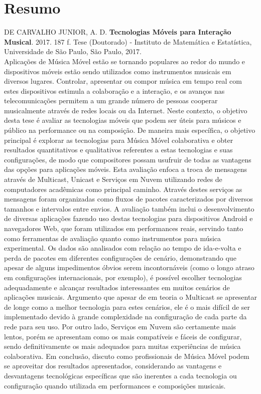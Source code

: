 \documentclass[11pt,twoside,a4paper]{book}
\begin{document}
	\chapter*{Resumo}
	
	\noindent DE CARVALHO JUNIOR, A. D. \textbf{Tecnologias Móveis para Interação Musical}. 
	2017. 187 f.
	Tese (Doutorado) - Instituto de Matemática e Estatística,
	Universidade de São Paulo, São Paulo, 2017.
	\\
	
	Aplicações de Música Móvel estão se tornando populares ao redor do mundo e dispositivos móveis estão sendo utilizados como instrumentos musicais em diversos lugares.
	Controlar, apresentar ou compor música em tempo real com estes dispositivos estimula a colaboração e a interação, e os avanços nas telecomunicações permitem a um grande número de pessoas cooperar musicalmente através de redes locais ou da Internet.
	Neste contexto, o objetivo desta tese é avaliar as tecnologias móveis que podem ser úteis para músicos e público na performance ou na composição.
	De maneira mais específica, o objetivo principal é explorar as tecnologias para Música Móvel colaborativa e obter resultados quantitativos e qualitativos referentes a estas tecnologias e suas configurações, de modo que compositores possam usufruir de todas as vantagens das opções para aplicações móveis.
	Esta avaliação enfoca a troca de mensagens através de Multicast, Unicast e Serviços em Nuvem utilizando redes de computadores acadêmicas como principal caminho.
	Através destes serviços as mensagens foram organizadas como fluxos de pacotes caracterizados por diversos tamanhos e intervalos entre envios.
	A avaliação também inclui o desenvolvimento de diversas aplicações fazendo uso destas tecnologias para dispositivos Android e navegadores Web, que foram utilizados em performances reais, servindo tanto como ferramentas de avaliação quanto como instrumentos para música experimental.
	Os dados são analisados com relação ao tempo de ida-e-volta e perda de pacotes em diferentes configurações de cenário, demonstrando que apesar de alguns impedimentos óbvios serem incontornáveis (como o longo atraso em configurações internacionais, por exemplo), é possível escolher tecnologias adequadamente e alcançar resultados interessantes em muitos cenários de aplicações musicais.
	Argumento que apesar de em teoria o Multicast se apresentar de longe como a melhor tecnologia para estes cenários, ele é o mais difícil de ser implementado devido à grande complexidade na configuração de cada parte da rede para seu uso.
	Por outro lado, Serviços em Nuvem são certamente mais lentos, porém se apresentam como os mais compatíveis e fáceis de configurar, sendo definitivamente os mais adequados para muitas experiências de música colaborativa.
	Em conclusão, discuto como profissionais de Música Móvel podem se aproveitar dos resultados apresentados, considerando as vantagens e desvantagens tecnológicas específicas que são inerentes a cada tecnologia ou configuração quando utilizada em performances e composições musicais.
	\\
	
\end{document}
